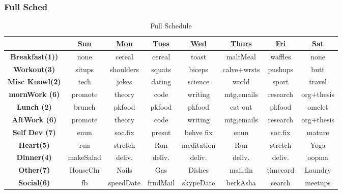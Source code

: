 \begin{frame}
\frametitle{Full Sched} 
\begin{table}[h!]
  \begin{center}
    \small
    \begin{tabular}{ | c || c | c | c | c | c | c | c |}
      \hline
      & \underline{Sun} & \underline{Mon} & \underline{Tues} & \underline{Wed} & \underline{Thurs} & \underline{Fri} & \underline{Sat} \\ 
      \hline
      \tiny \textbf{Breakfast(1))}  &  \tiny none & \tiny cereal & \tiny cereal & \tiny toast  & \tiny maltMeal  & \tiny waffles & \tiny none \\ 
      \hline
      \tiny \textbf{Workout(3)} & \tiny situps & \tiny shoulders  & \tiny squats  & \tiny biceps  & \tiny calve+wrsts  & \tiny pushups  & \tiny butt \\ 
      \hline
      \tiny \textbf{Misc Knowl(2)} & \tiny tech  & \tiny jokes & \tiny dating & \tiny science  & \tiny world & \tiny sport & \tiny travel \\ 
      \hline 
      \tiny \textbf{mornWork (6)} & \tiny promote  & \tiny theory & \tiny code & \tiny writing  & \tiny mtg,emails & \tiny research  & \tiny org+thesis \\  
      \hline
      \tiny \textbf{Lunch (2)}  &  \tiny brunch & \tiny pkfood & \tiny pkfood & \tiny pkfood  & \tiny eat out & \tiny pkfood  & \tiny omelet \\ 
      \hline
      \tiny \textbf{AftWork (6)} & \tiny promote  & \tiny theory & \tiny code & \tiny writing  & \tiny mtg,emails & \tiny research  & \tiny org+thesis \\ 
      \hline
      \tiny \textbf{Self Dev (7)} & \tiny enun & \tiny soc.fix  & \tiny presnt & \tiny behve fix & \tiny enun  & \tiny soc.fix & \tiny mature \\
      \hline 
      \tiny \textbf{Heart(5)} & \tiny run  & \tiny stretch  & \tiny Run & \tiny meditation  & \tiny Run & \tiny stretch  & \tiny Yoga \\ 
      \hline
      \tiny \textbf{Dinner(4)}  & \tiny makeSalad & \tiny deliv. & \tiny deliv. & \tiny deliv.  & \tiny deliv.  & \tiny deliv. & \tiny oopma \\
      \hline 
      \tiny \textbf{Other(7)} & \tiny HouseCln & \tiny Nails  & \tiny Gas & \tiny Dishes & \tiny mail,fin & \tiny timecard & \tiny Laundry \\ 
      \hline 
      \tiny \textbf{Social(6)} & \tiny fb & \tiny speedDate & \tiny frndMail & \tiny skypeDate  & \tiny berkAsha & \tiny search  & \tiny meetups \\ 
      \hline 
    \end{tabular}
  \end{center}
  \caption{Full Schedule}
\end{table}
\end{frame} 

